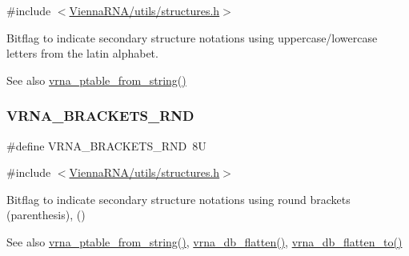 {\ttfamily \#include $<$\hyperlink{utils_2structures_8h}{Vienna\+R\+N\+A/utils/structures.\+h}$>$}



Bitflag to indicate secondary structure notations using uppercase/lowercase letters from the latin alphabet. 

\begin{DoxySeeAlso}{See also}
\hyperlink{group__struct__utils__pair__table_gac76c9ef3de507748fb0416a59323362b}{vrna\+\_\+ptable\+\_\+from\+\_\+string()} 
\end{DoxySeeAlso}
\mbox{\label{group__struct__utils__dot__bracket_gac92d5fa7c6625bce2670ece510a24fbd}} 
\subsubsection{\texorpdfstring{V\+R\+N\+A\+\_\+\+B\+R\+A\+C\+K\+E\+T\+S\+\_\+\+R\+ND}{VRNA\_BRACKETS\_RND}}
{\footnotesize\ttfamily \#define V\+R\+N\+A\+\_\+\+B\+R\+A\+C\+K\+E\+T\+S\+\_\+\+R\+ND~8U}



{\ttfamily \#include $<$\hyperlink{utils_2structures_8h}{Vienna\+R\+N\+A/utils/structures.\+h}$>$}



Bitflag to indicate secondary structure notations using round brackets (parenthesis), {\ttfamily ()} 

\begin{DoxySeeAlso}{See also}
\hyperlink{group__struct__utils__pair__table_gac76c9ef3de507748fb0416a59323362b}{vrna\+\_\+ptable\+\_\+from\+\_\+string()}, \hyperlink{group__struct__utils__dot__bracket_gae966b9f44168a4f4b39ca42ffb5f37b7}{vrna\+\_\+db\+\_\+flatten()}, \hyperlink{group__struct__utils__dot__bracket_ga690425199c8b71545e7196e3af1436f8}{vrna\+\_\+db\+\_\+flatten\+\_\+to()} 
\end{DoxySeeAlso}
\mbox{\label{group__struct__utils__dot__bracket_gaf41be40e79cb756c4e0bb8edb4d803d2}} 
